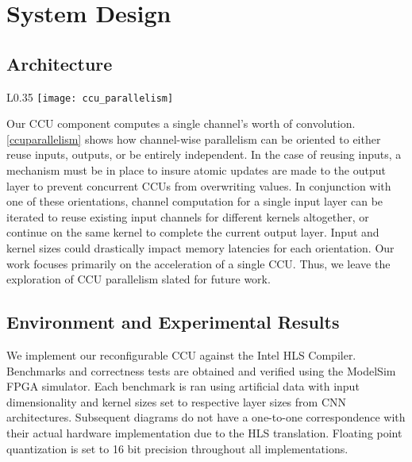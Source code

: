 \chapter{System Design}
\section{Architecture}

\begin{wrapfigure}{L}{0.35\textwidth}
	\texttt{[image: ccu\_parallelism]}
	\caption[CCU Channel-Wise Parallelism]%
	{\narrower Channel-wise convolution oriented to either reuse inputs, outputs, or stay independent.}
	\label{ccuparallelism}
\end{wrapfigure}

Our CCU component computes a single channel's worth of convolution. \ref{ccuparallelism} shows how channel-wise parallelism can be oriented to either reuse inputs, outputs, or be entirely independent. In the case of reusing inputs, a mechanism must be in place to insure atomic updates are made to the output layer to prevent concurrent CCUs from overwriting values. In conjunction with one of these orientations, channel computation for a single input layer can be iterated to reuse existing input channels for different kernels altogether, or continue on the same kernel to complete the current output layer. Input and kernel sizes could drastically impact memory latencies for each orientation. Our work focuses primarily on the acceleration of a single CCU. Thus, we leave the exploration of CCU parallelism slated for future work.


\section{Environment and Experimental Results}
We implement our reconfigurable CCU against the Intel HLS Compiler. Benchmarks and correctness tests are obtained and verified using the ModelSim FPGA simulator. Each benchmark is ran using artificial data with input dimensionality and kernel sizes set to respective layer sizes from CNN architectures. Subsequent diagrams do not have a one-to-one correspondence with their actual hardware implementation due to the HLS translation. Floating point quantization is set to 16 bit precision throughout all implementations.


